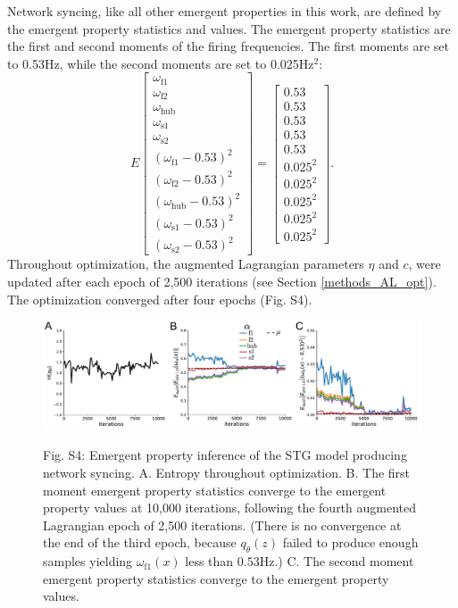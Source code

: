\documentclass[11pt]{article}
\begin{document}
Network syncing, like all other emergent properties in this work, are defined by the emergent property statistics and values.  The emergent property statistics are the first and second moments of the firing frequencies. The first moments are set to 0.53Hz, while the second moments are set to 0.025Hz$^2$:
\begin{equation}
E \begin{bmatrix} \omega_{\text{f1}} \\ \omega_{\text{f2}} \\ \omega_{\text{hub}} \\ \omega_{\text{s1}} \\ \omega_{\text{s2}} \\ (\omega_{\text{f1}} - 0.53)^2 \\ (\omega_{\text{f2}} - 0.53)^2 \\ (\omega_{\text{hub}} - 0.53)^2 \\ (\omega_{\text{s1}} - 0.53)^2 \\ (\omega_{\text{s2}} - 0.53)^2  \end{bmatrix} = \begin{bmatrix} 0.53 \\ 0.53 \\ 0.53 \\ 0.53 \\ 0.53 \\ 0.025^2 \\ 0.025^2 \\ 0.025^2 \\ 0.025^2 \\ 0.025^2 \end{bmatrix}.
\end{equation}
Throughout optimization, the augmented Lagrangian parameters $\eta$ and $c$, were updated after each epoch of 2,500 iterations (see Section \ref{methods_AL_opt}).  The optimization converged after four epochs (Fig. S4).

\begin{figure}
\begin{center}
\includegraphics[scale=0.4]{figures/figS5/figS5.pdf}
\end{center}
\begin{flushleft}
Fig. S4: Emergent property inference of the STG model producing network syncing. A. Entropy throughout optimization. B. The first moment emergent property statistics converge to the emergent property values at 10,000 iterations, following the fourth augmented Lagrangian epoch of 2,500 iterations.  (There is no convergence at the end of the third epoch, because $q_\theta(z)$ failed to produce enough samples yielding $\omega_{\text{f1}}(x)$ less than $0.53$Hz.)    C. The second moment emergent property statistics converge to the emergent property values.
\end{flushleft}
\end{figure}
\end{document}
